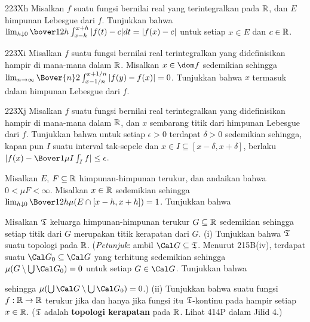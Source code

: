 {\spheader 223Xh Misalkan $f$ suatu fungsi bernilai real yang terintegralkan
pada $\Bbb R$, dan $E$ himpunan Lebesgue dari $f$. Tunjukkan bahwa
$\lim_{h\downarrow 0}\bover1{2h}\int_{x-h}^{x+h}|f(t)-c|dt=|f(x)-c|$
untuk setiap $x\in E$ dan $c\in\Bbb R$.

\spheader 223Xi Misalkan $f$ suatu fungsi bernilai real terintegralkan yang
didefinisikan hampir di mana-mana dalam $\Bbb R$. Misalkan $x\in\dom f$
sedemikian sehingga
$\lim_{n\to\infty}\Bover{n}2\int^{x+1/n}_{x-1/n}|f(y)-f(x)|=0$.
Tunjukkan bahwa $x$ termasuk dalam himpunan Lebesgue dari $f$.

\spheader 223Xj Misalkan $f$ suatu fungsi bernilai real terintegralkan yang
didefinisikan hampir di mana-mana dalam $\Bbb R$, dan $x$ sembarang titik
dari himpunan Lebesgue dari $f$. Tunjukkan bahwa untuk setiap $\epsilon>0$
terdapat $\delta>0$ sedemikian sehingga, kapan pun $I$ suatu interval
tak-sepele dan $x\in I\subseteq[x-\delta,x+\delta]$, berlaku
$|f(x)-\Bover1{\mu I}\int_If|\le\epsilon$.

 Misalkan $E$, $F\subseteq\Bbb R$
himpunan-himpunan terukur, dan andaikan bahwa $0<\mu F<\infty$. Misalkan
$x\in\Bbb R$ sedemikian sehingga
$\lim_{h\downarrow 0}\Bover1{2h}\mu(E\cap[x-h,x+h])=1$. Tunjukkan bahwa


\noindent {}

 Misalkan $\frak T$ keluarga himpunan-himpunan
terukur $G\subseteq\Bbb R$ sedemikian sehingga setiap titik dari $G$ merupakan
titik kerapatan dari $G$. {(i)} Tunjukkan bahwa $\frak T$ suatu topologi
pada $\Bbb R$. ({\it Petunjuk\/}: ambil $\Cal G\subseteq\frak T$. Menurut
215B(iv), terdapat suatu $\Cal G_0\subseteq\Cal G$ yang terhitung sedemikian
sehingga $\mu(G\setminus\bigcup\Cal G_0)=0$ untuk setiap $G\in\Cal G$.
Tunjukkan bahwa


\noindent sehingga
$\mu(\bigcup\Cal G\setminus\bigcup\Cal G_0)=0$.) {(ii)} Tunjukkan bahwa
suatu fungsi $f:\Bbb R\to\Bbb R$ terukur jika dan hanya jika fungsi itu
$\frak T$-kontinu pada hampir setiap $x\in\Bbb R$. ($\frak T$ adalah
{\bf topologi kerapatan} pada $\Bbb R$. Lihat 414P dalam Jilid 4.)

}
